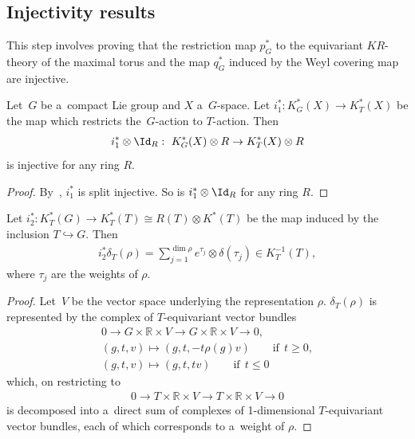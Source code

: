 \subsection{Injectivity results}
This step involves proving that the restriction map $p_G^*$ to the equivariant $KR$-theory of the maximal torus and the
map $q_G^*$ induced by the Weyl covering map are injective.
\begin{Lemma}
\label{ringinj}
Let~$G$ be a~compact Lie group and $X$ a~$G$-space.
Let $i_1^*: K_G^*(X)\to K^*_T(X)$ be the map which restricts the~$G$-action to $T$-action.
Then
\begin{gather*}
i_1^*\otimes\Id_R: \  K^*_G(X)\otimes R\to K_T^*(X)\otimes R
\end{gather*}
is injective for any ring $R$.
\end{Lemma}
\begin{proof}
By~\cite[Proposition 4.9]{At4}, $i_1^*$ is split injective.
So is $i_1^*\otimes\Id_R$ for any ring $R$.
\end{proof}
\begin{Lemma}
\label{decomposition}
Let $i_2^*: K_T^*(G)\to K_T^*(T)\cong R(T)\otimes K^*(T)$ be the map induced by the inclusion $T\hookrightarrow G$.
Then
\begin{gather*}
i_2^*\delta_T(\rho)=
\sum\limits_{j=1}^{\dim\rho}e^{\tau_j}\otimes\delta(\tau_j)\in K_T^{-1}(T),
\end{gather*}
where $\tau_j$ are the weights of $\rho$.
\end{Lemma}
\begin{proof}
Let~$V$ be the vector space underlying the representation $\rho$.
$\delta_T(\rho)$ is represented by the complex of $T$-equivariant vector bundles
\begin{gather*}
0\longrightarrow G\times\mathbb{R}\times V \longrightarrow G\times\mathbb{R}\times V\longrightarrow 0,
\\
(g, t, v)  \mapsto  (g, t, -t\rho(g)v) \qquad\text{if} \ \ t\geq 0,
\\
(g, t, v)  \mapsto  (g, t, tv) \qquad\text{if} \ \ t\leq 0
\end{gather*}
which, on restricting to
\begin{gather*}
0\longrightarrow T\times\mathbb{R}\times V
\stackrel{}
{\longrightarrow}T\times\mathbb{R}\times V\longrightarrow 0
\end{gather*}
is decomposed into a~direct sum of complexes of 1-dimensional $T$-equivariant vector bundles, each of which corresponds
to a~weight of $\rho$.
\end{proof}

